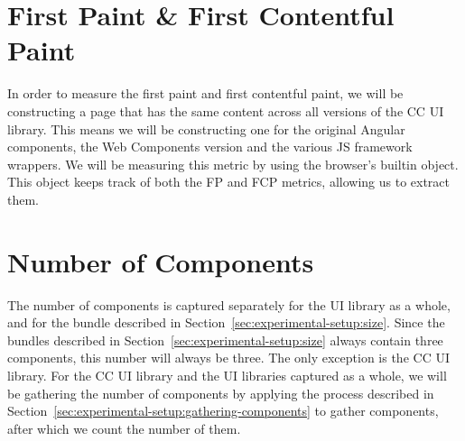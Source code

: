 \section{First Paint \& First Contentful Paint}
In order to measure the first paint and first contentful paint, we will be constructing a page that has the same content across all versions of the CC UI library. This means we will be constructing one for the original Angular components, the Web Components version and the various JS framework wrappers. We will be measuring this metric by using the browser's builtin  object. This object keeps track of both the FP and FCP metrics, allowing us to extract them.

\section{Number of Components}
The number of components is captured separately for the UI library as a whole, and for the bundle described in Section~\ref{sec:experimental-setup:size}. Since the bundles described in Section~\ref{sec:experimental-setup:size} always contain three components, this number will always be three. The only exception is the CC UI library. For the CC UI library and the UI libraries captured as a whole, we will be gathering the number of components by applying the process described in Section~\ref{sec:experimental-setup:gathering-components} to gather components, after which we count the number of them.
